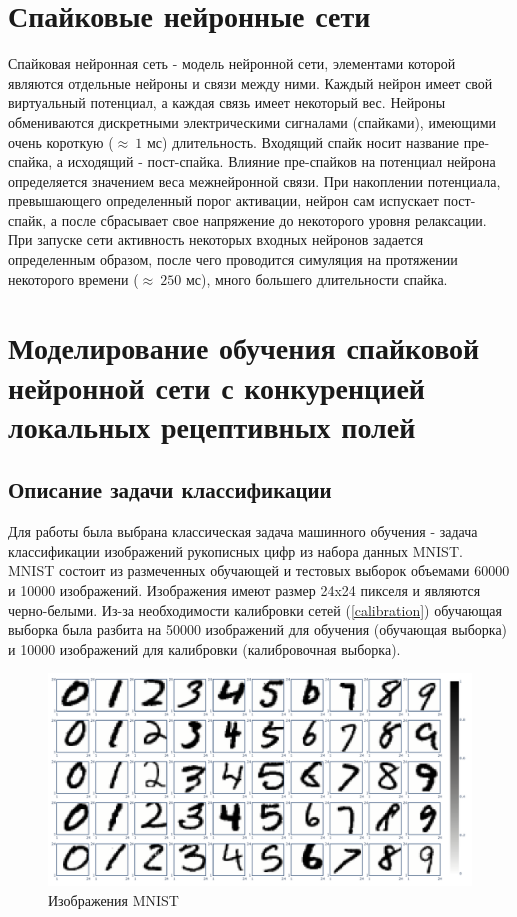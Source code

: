 \documentclass[a4paper]{article}
\begin{document}
\section{Спайковые нейронные сети}
Спайковая нейронная сеть - модель нейронной сети, элементами которой являются  отдельные нейроны и связи между ними. Каждый нейрон имеет свой виртуальный потенциал, а каждая связь имеет некоторый вес. Нейроны обмениваются дискретными электрическими сигналами (спайками), имеющими очень короткую ($ \approx ~1$ мс) длительность. Входящий спайк носит название пре-спайка, а исходящий - пост-спайка.  Влияние пре-спайков на потенциал нейрона определяется значением веса межнейронной связи. При накоплении потенциала, превышающего определенный порог активации, нейрон сам испускает пост-спайк, а после сбрасывает свое напряжение до некоторого уровня релаксации. При запуске сети активность некоторых входных нейронов задается определенным образом, после чего проводится симуляция на протяжении некоторого времени ($\approx ~250$ мс), много большего длительности спайка.

\section{Моделирование обучения спайковой нейронной сети с конкуренцией локальных рецептивных полей}

\subsection{Описание задачи классификации} 
Для работы была выбрана классическая задача машинного обучения - задача классификации изображений рукописных цифр из набора данных MNIST. MNIST состоит из размеченных обучающей и тестовых выборок объемами 60000 и 10000 изображений. Изображения имеют размер 24x24 пикселя и являются черно-белыми. Из-за необходимости калибровки сетей (\ref{calibration}) обучающая выборка была разбита на 50000 изображений для обучения (обучающая выборка) и 10000 изображений для калибровки (калибровочная выборка).


\begin{figure} \label{MNIST} 
 \includegraphics[width=.5\textwidth,keepaspectratio=true]{MNIST.pdf} 
 
 \caption{Изображения MNIST}
\end{figure}
\end{document}
